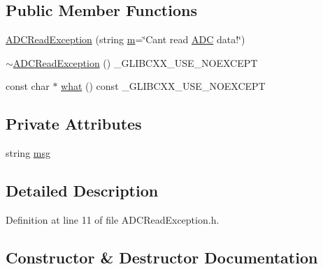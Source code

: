 \subsection*{Public Member Functions}
\begin{DoxyCompactItemize}
\item 
\hyperlink{class_hardware_1_1_exception_1_1_a_d_c_read_exception_aaa76cf7aa3fe32c27ea600c72ea4335a}{A\+D\+C\+Read\+Exception} (string \hyperlink{_gen_blob_8m_ab3cd915d758008bd19d0f2428fbb354a}{m}=\char`\"{}Can\textquotesingle{}t read \hyperlink{class_hardware_1_1_a_d_c}{A\+D\+C} data!\char`\"{})
\item 
\hyperlink{class_hardware_1_1_exception_1_1_a_d_c_read_exception_ad59cb380b2b8eee90a87a398a3511d50}{$\sim$\+A\+D\+C\+Read\+Exception} () \+\_\+\+G\+L\+I\+B\+C\+X\+X\+\_\+\+U\+S\+E\+\_\+\+N\+O\+E\+X\+C\+E\+P\+T
\item 
const char $\ast$ \hyperlink{class_hardware_1_1_exception_1_1_a_d_c_read_exception_aa2c8ee0d183837450a0dea15901e3dc4}{what} () const \+\_\+\+G\+L\+I\+B\+C\+X\+X\+\_\+\+U\+S\+E\+\_\+\+N\+O\+E\+X\+C\+E\+P\+T
\end{DoxyCompactItemize}
\subsection*{Private Attributes}
\begin{DoxyCompactItemize}
\item 
string \hyperlink{class_hardware_1_1_exception_1_1_a_d_c_read_exception_a42211528535b1f00abf6b86d8c3429c9}{msg}
\end{DoxyCompactItemize}


\subsection{Detailed Description}


Definition at line 11 of file A\+D\+C\+Read\+Exception.\+h.



\subsection{Constructor \& Destructor Documentation}
\hypertarget{class_hardware_1_1_exception_1_1_a_d_c_read_exception_aaa76cf7aa3fe32c27ea600c72ea4335a}{}
